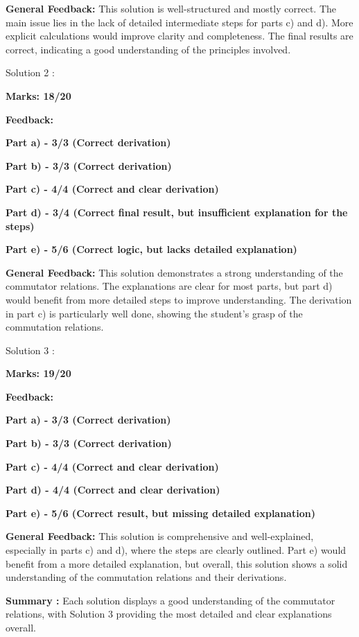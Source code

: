 \documentclass[a4paper,11pt]{article}
\begin{document}
\textbf{General Feedback:}
This solution is well-structured and mostly correct. The main issue lies in the lack of detailed intermediate steps for parts c) and d). More explicit calculations would improve clarity and completeness. The final results are correct, indicating a good understanding of the principles involved.


Solution 2 :

\textbf{Marks: 18/20}

\textbf{Feedback:}

\textbf{Part a) - 3/3 (Correct derivation)}

\textbf{Part b) - 3/3 (Correct derivation)}

\textbf{Part c) - 4/4 (Correct and clear derivation)}

\textbf{Part d) - 3/4 (Correct final result, but insufficient explanation for the steps)}

\textbf{Part e) - 5/6 (Correct logic, but lacks detailed explanation)}


\textbf{General Feedback:}
This solution demonstrates a strong understanding of the commutator relations. The explanations are clear for most parts, but part d) would benefit from more detailed steps to improve understanding. The derivation in part c) is particularly well done, showing the student's grasp of the commutation relations.

Solution 3 :

\textbf{Marks: 19/20}

\textbf{Feedback:}

\textbf{Part a) -  3/3 (Correct derivation)}

\textbf{Part b) - 3/3 (Correct derivation)}

\textbf{Part c) - 4/4 (Correct and clear derivation)}

\textbf{Part d) - 4/4 (Correct and clear derivation)}

\textbf{Part e) - 5/6 (Correct result, but missing detailed explanation)}


\textbf{General Feedback:}
This solution is comprehensive and well-explained, especially in parts c) and d), where the steps are clearly outlined. Part e) would benefit from a more detailed explanation, but overall, this solution shows a solid understanding of the commutation relations and their derivations.

\textbf{Summary :}
Each solution displays a good understanding of the commutator relations, with Solution 3 providing the most detailed and clear explanations overall.
\end{document}
